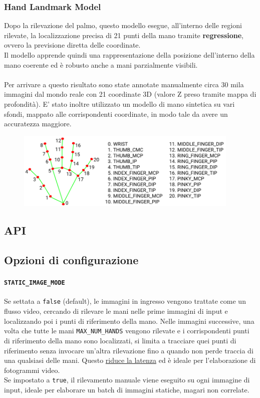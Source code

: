 \subsubsection{Hand Landmark Model} 

Dopo la rilevazione del palmo, questo modello esegue, all'interno delle regioni rilevate, la localizzazione precisa di 21 punti della mano tramite \textbf{regressione}, ovvero la previsione diretta delle coordinate.\\
Il modello apprende quindi una rappresentazione della posizione dell'interno della mano coerente ed è robusto anche a mani parzialmente visibili.\\
\\
\noindent Per arrivare a questo risultato sono state annotate manualmente circa 30 mila immagini dal mondo reale con 21 coordinate 3D (valore Z preso tramite mappa di profondità). E' stato inoltre utilizzato un modello di mano sintetica su vari sfondi, mappato alle corrispondenti coordinate, in modo tale da avere un accuratezza maggiore.
\begin{figure}[H]
    \centering
    \includegraphics[width=0.95\textwidth]{images/landmarks.png}
\end{figure}

\newpage
\subsection{API} 

\subsection{Opzioni di configurazione}


\paragraph{\texttt{STATIC\_IMAGE\_MODE}} Se settata a \texttt{false} (default), le immagini in ingresso vengono trattate come un flusso video, cercando di rilevare le mani nelle prime immagini di input e localizzando poi i punti di riferimento della mano. Nelle immagini successive, una volta che tutte le mani \texttt{MAX\_NUM\_HANDS} vengono rilevate e i corrispondenti punti di riferimento della mano sono localizzati, si limita a tracciare quei punti di riferimento senza invocare un'altra rilevazione fino a quando non perde traccia di una qualsiasi delle mani. Questo \underline{riduce la latenza} ed è ideale per l'elaborazione di fotogrammi video.\\
Se impostato a \texttt{true}, il rilevamento manuale viene eseguito su ogni immagine di input, ideale per elaborare un batch di immagini statiche, magari non correlate.

